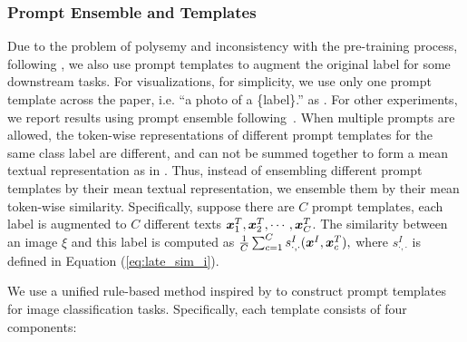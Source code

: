 


\subsubsection{Prompt Ensemble and Templates}
\label{sec:prompt_ensemble}

Due to the problem of polysemy and inconsistency with the pre-training process, following \citet{radford2021learning}, we also use prompt templates to augment the original label for some downstream tasks.
For visualizations, for simplicity, we 
use only one prompt template across the paper, i.e. ``a photo of a \{label\}.'' as  \citet{radford2021learning}.
For other experiments, we
report results using prompt ensemble following~\citet{radford2021learning}.
When multiple prompts are allowed, the token-wise representations of different prompt templates for the same class label are different, and can not be summed together to form 
a mean textual representation as in \citep{radford2021learning}.
Thus, instead of ensembling different prompt templates by their mean textual representation, we ensemble them
by their mean token-wise similarity.
Specifically, suppose there are $C$ prompt templates, each label is augmented to $C$ different texts ${\bm{x}}^T_1, {\bm{x}}^T_2, \cdots, {\bm{x}}^T_C$.
The 
similarity between an image $\xi$ and this label is computed as
$
\frac{1}{C}\sum_{c=1}^C s_{\cdot,\cdot}^I ({\bm{x}}^I, {\bm{x}}^T_c),
$
where $s_{\cdot,\cdot}^I$ is defined in Equation (\ref{eq:late_sim_i}).

We use a unified rule-based method inspired by \citet{radford2018improving}
to construct  prompt templates for image classification tasks.
Specifically, each template consists of four components:

